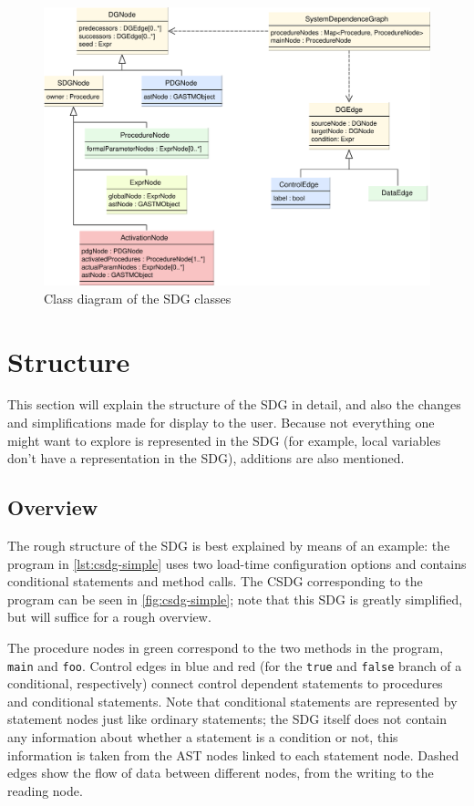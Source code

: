 \begin{figure}[htb]
  \centering
    \includegraphics[width=\textwidth]{bilder/classes-sdg}
  \caption{Class diagram of the SDG classes}
  \label{fig:classes-sdg}
\end{figure}


\section{Structure}

This section will explain the structure of the SDG in detail, and also the changes and simplifications made for display 
to the user. Because not everything one might want to explore is represented in the SDG (for example, local variables 
don't have a representation in the SDG), additions are also mentioned.


\subsection{Overview}

The rough structure of the SDG is best explained by means of an example: the program in \autoref{lst:csdg-simple} uses 
two load-time configuration options and contains conditional statements and method calls. The CSDG corresponding to the 
program can be seen in \autoref{fig:csdg-simple}; note that this SDG is greatly simplified, but will suffice for a 
rough overview.

The procedure nodes in green correspond to the two methods in the program, \lstinline|main| and \lstinline|foo|. 
Control edges in blue and red (for the \lstinline|true| and \lstinline|false| branch of a conditional, respectively) 
connect control dependent statements to procedures and conditional statements. Note that conditional statements are 
represented by statement nodes just like ordinary statements; the SDG itself does not contain any information about 
whether a statement is a condition or not, this information is taken from the AST nodes linked to each statement node. 
Dashed edges show the flow of data between different nodes, from the writing to the reading node.

